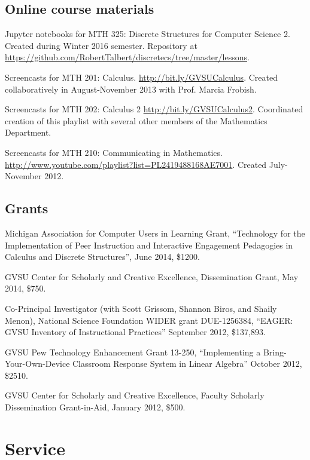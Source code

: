 \documentclass[letterpaper]{article}
\renewenvironment{itemize}{
  \begin{list}{}{
    \setlength{\leftmargin}{1.5em}
	\setlength{\itemsep}{0in}
  }
}{
  \end{list}
}
\begin{document}
\subsection*{Online course materials}
\begin{itemize}
	\item Jupyter notebooks for MTH 325: Discrete Structures for Computer Science 2. Created during Winter 2016 semester. Repository at \url{https://github.com/RobertTalbert/discretecs/tree/master/lessons}.
	\item Screencasts for MTH 201: Calculus. \url{http://bit.ly/GVSUCalculus}. Created collaboratively in August-November 2013 with Prof. Marcia Frobish.
	\item Screencasts for MTH 202: Calculus 2 \url{http://bit.ly/GVSUCalculus2}. Coordinated creation of this playlist with several other members of the Mathematics Department.
	\item Screencasts for MTH 210: Communicating in Mathematics. \url{http://www.youtube.com/playlist?list=PL2419488168AE7001}. Created July-November 2012.
\end{itemize}


\subsection*{Grants}
\begin{itemize}
	\item Michigan Association for Computer Users in Learning Grant, ``Technology for the Implementation of Peer Instruction and Interactive Engagement Pedagogies in Calculus and Discrete Structures'', June 2014, \$1200.
	\item GVSU Center for Scholarly and Creative Excellence, Dissemination Grant, May 2014, \$750.
	\item Co-Principal Investigator (with Scott Grissom, Shannon Biros, and Shaily Menon), National Science Foundation WIDER grant DUE-1256384, ``EAGER: GVSU Inventory of Instructional Practices'' September 2012, \$137,893.
	\item GVSU Pew Technology Enhancement Grant 13-250, ``Implementing a Bring-Your-Own-Device Classroom Response System in Linear Algebra'' October 2012, \$2510.
	\item GVSU Center for Scholarly and Creative Excellence, Faculty Scholarly Dissemination Grant-in-Aid, January 2012, \$500.
\end{itemize}




\section*{Service}
\end{document}
